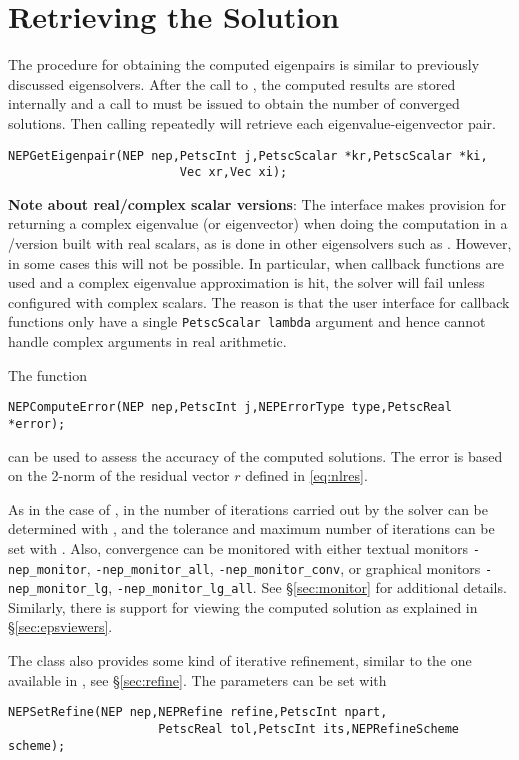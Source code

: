 \section{Retrieving the Solution}

The procedure for obtaining the computed eigenpairs is similar to previously discussed eigensolvers. After the call to , the computed results are stored internally and a call to  must be issued to obtain the number of converged solutions. Then calling  repeatedly will retrieve each eigenvalue-eigenvector pair.

	\begin{Verbatim}[fontsize=\small]
	NEPGetEigenpair(NEP nep,PetscInt j,PetscScalar *kr,PetscScalar *ki,
                        Vec xr,Vec xi);
	\end{Verbatim}

\textbf{Note about real/complex scalar versions}: The interface makes provision for returning a complex eigenvalue (or eigenvector) when doing the computation in a \petsc/\slepc version built with real scalars, as is done in other eigensolvers such as . However, in some cases this will not be possible. In particular, when callback functions are used and a complex eigenvalue approximation is hit, the solver will fail unless configured with complex scalars. The reason is that the user interface for callback functions only have a single \texttt{PetscScalar lambda} argument and hence cannot handle complex arguments in real arithmetic.

\medskip

The function
	\begin{Verbatim}[fontsize=\small]
	NEPComputeError(NEP nep,PetscInt j,NEPErrorType type,PetscReal *error);
	\end{Verbatim}
can be used to assess the accuracy of the computed solutions. The error is based on the 2-norm of the residual vector $r$ defined in \eqref{eq:nlres}.

As in the case of , in  the number of iterations carried out by the solver can be determined with , and the tolerance and maximum number of iterations can be set with . Also, convergence can be monitored with either textual monitors \Verb!-nep_monitor!, \Verb!-nep_monitor_all!, \Verb!-nep_monitor_conv!, or graphical monitors \Verb!-nep_monitor_lg!, \Verb!-nep_monitor_lg_all!. See \S\ref{sec:monitor} for additional details. Similarly, there is support for viewing the computed solution as explained in \S\ref{sec:epsviewers}.


The  class also provides some kind of iterative refinement, similar to the one available in , see \S\ref{sec:refine}. The parameters can be set with
	\begin{Verbatim}[fontsize=\small]
	NEPSetRefine(NEP nep,NEPRefine refine,PetscInt npart,
                     PetscReal tol,PetscInt its,NEPRefineScheme scheme);
	\end{Verbatim}


